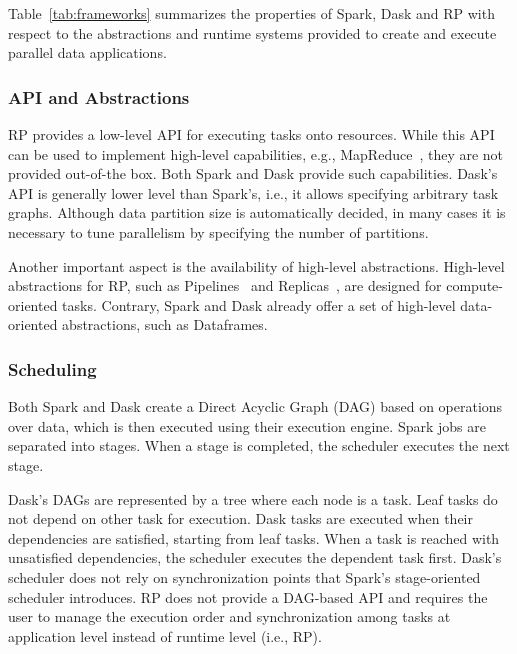 Table~\ref{tab:frameworks} summarizes the properties of Spark, Dask and
RP with respect to the abstractions and runtime systems provided to
create and execute parallel data applications.

\subsubsection*{API and Abstractions}

RP provides a low-level API for executing tasks onto resources. While
this API can be used to implement high-level capabilities, e.g.,
MapReduce~\cite{mantha2012pilot}, they are not provided out-of-the box. Both
Spark and Dask provide such capabilities. Dask's API is generally lower level
than Spark's, i.e., it allows specifying arbitrary task graphs. Although data
partition size is automatically decided, in many cases it is necessary to tune
parallelism by specifying the number of partitions.

Another important aspect is the availability of high-level abstractions.
High-level abstractions for RP, such as 
Pipelines~\cite{balasubramanian2018harnessing} and 
Replicas~\cite{dakka2018concurrent}, are designed for compute-oriented 
tasks. Contrary, Spark and Dask already offer a set of
high-level data-oriented abstractions, such as Dataframes. 


\subsubsection*{Scheduling}

Both Spark and Dask create a Direct Acyclic Graph (DAG) based on operations over
data, which is then executed using their execution engine. Spark jobs are
separated into stages. When a stage is completed, the scheduler executes the
next stage.

Dask's DAGs are represented by a tree where each node is a task. Leaf tasks do
not depend on other task for execution. Dask tasks are executed when their
dependencies are satisfied, starting from leaf tasks. When a task is reached
with unsatisfied dependencies, the scheduler executes the dependent task first.
Dask's scheduler does not rely on synchronization points that Spark's
stage-oriented scheduler introduces. RP does not provide a DAG-based
API and requires the user to manage the execution order and synchronization
among tasks at application level instead of runtime level (i.e., RP).

